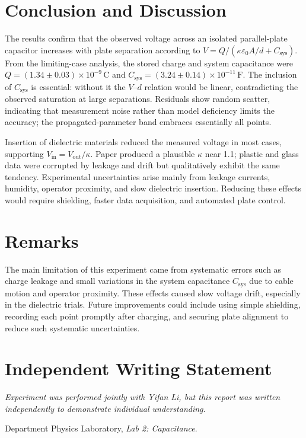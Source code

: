 \documentclass[12pt]{article}
\newcommand{\ManualTitle}{Lab 2: Capacitance}
\begin{document}
\section{Conclusion and Discussion}
The results confirm that the observed voltage across an isolated parallel-plate capacitor increases with plate separation according to \(V=Q/(\kappa\varepsilon_0A/d+C_{\mathrm{sys}})\).  
From the limiting-case analysis, the stored charge and system capacitance were
\(Q=(1.34\pm0.03)\times10^{-9}\,\mathrm{C}\) and
\(C_{\mathrm{sys}}=(3.24\pm0.14)\times10^{-11}\,\mathrm{F}\).
The inclusion of \(C_{\mathrm{sys}}\) is essential: without it the \(V\)–\(d\) relation would be linear, contradicting the observed saturation at large separations.
Residuals show random scatter, indicating that measurement noise rather than model deficiency limits the accuracy; the propagated-parameter band embraces essentially all points.

Insertion of dielectric materials reduced the measured voltage in most cases, supporting \(V_{\mathrm{in}}=V_{\mathrm{out}}/\kappa\).  
Paper produced a plausible \(\kappa\) near 1.1; plastic and glass data were corrupted by leakage and drift but qualitatively exhibit the same tendency.  
Experimental uncertainties arise mainly from leakage currents, humidity, operator proximity, and slow dielectric insertion.  
Reducing these effects would require shielding, faster data acquisition, and automated plate control.

\section{Remarks}
The main limitation of this experiment came from systematic errors such as charge leakage and small variations in the system capacitance \(C_{\mathrm{sys}}\) due to cable motion and operator proximity. These effects caused slow voltage drift, especially in the dielectric trials. Future improvements could include using simple shielding, recording each point promptly after charging, and securing plate alignment to reduce such systematic uncertainties.


\section*{Independent Writing Statement}
\emph{Experiment was performed jointly with Yifan Li, but this report was written independently to demonstrate individual understanding.}

\begin{thebibliography}{1}
Department Physics Laboratory, \emph{\ManualTitle}. 
\end{thebibliography}
\end{document}
